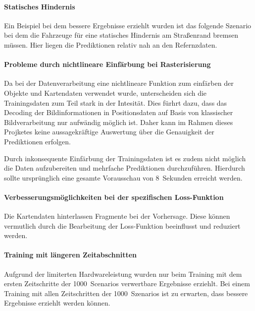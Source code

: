 \documentclass[12pt]{article}
\begin{document}
    \paragraph{Statisches Hindernis} Ein Beispiel bei dem bessere Ergebnisse erziehlt wurden ist das folgende Szenario bei dem die Fahrzeuge für eine statisches Hindernis am Straßenrand bremsen müssen. 
    Hier liegen die Prediktionen relativ nah an den Refernzdaten. %

    \paragraph{Probleme durch nichtlineare Einfärbung bei Rasterisierung} Da bei der Datenverarbeitung eine 
    nichtlineare Funktion zum einfärben der Objekte und Kartendaten verwendet wurde, unterscheiden sich die Trainingsdaten 
    zum Teil stark in der Intesität. Dies fürhrt dazu, dass das Decoding der Bildinformationen in Positionsdaten auf 
    Basis von klassischer Bildverarbeitung nur aufwändig möglich ist. Daher kann im Rahmen dieses Projketes keine aussagekräftige 
    Auswertung über die Genauigkeit der Prediktionen erfolgen.

    Durch inkonsequente Einfärbung der Trainingsdaten ist es zudem nicht möglich die Daten aufzubereiten und mehrfache Prediktionen durchzuführen.
    Hierdurch sollte ursprünglich eine gesamte Vorausschau von 8~Sekunden erreicht werden.

    \paragraph{Verbesserungsmöglichkeiten bei der spezifischen Loss-Funktion} Die Kartendaten hinterlassen Fragmente bei der Vorhersage. 
    Diese können vermutlich durch die Bearbeitung der Loss-Funktion beeinflusst und reduziert werden.
    \paragraph{Training mit längeren Zeitabschnitten} Aufgrund der limiterten Hardwareleistung wurden nur beim Training mit dem ersten 
    Zeitschritte der 1000~Scenarios verwertbare Ergebnisse erziehlt. Bei einem Training mit allen Zeitschritten der 1000~Szenarios ist zu erwarten, 
    dass bessere Ergebnisse erziehlt werden können.
\end{document}
